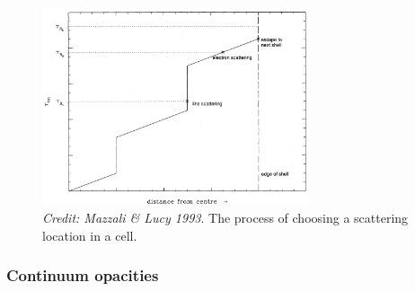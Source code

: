 \begin{figure}
\centering
\includegraphics[width=0.7\textwidth]{figures/03-radtrans/tau_scat.png}
\caption
{
{\sl Credit: Mazzali \& Lucy 1993}. 
The process of choosing a scattering location in a cell.
} 
\label{fig:scatter_ml93}
\end{figure}

\subsubsection{Continuum opacities}

